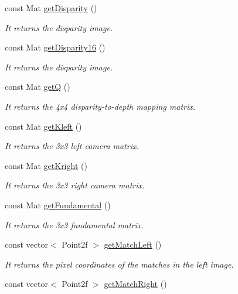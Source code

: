 \begin{DoxyCompactItemize}
const Mat \hyperlink{classStereoCamera_a97607922d84e1a1a006cd7a5aec93a24}{get\+Disparity} ()
\begin{DoxyCompactList}\small\item\em It returns the disparity image. \end{DoxyCompactList}\item 
const Mat \hyperlink{classStereoCamera_a89f9890f50d85be9ebda7a0769279348}{get\+Disparity16} ()
\begin{DoxyCompactList}\small\item\em It returns the disparity image. \end{DoxyCompactList}\item 
const Mat \hyperlink{classStereoCamera_a43bd5710058d9ee0ed94dc8b74e5656c}{get\+Q} ()
\begin{DoxyCompactList}\small\item\em It returns the 4x4 disparity-\/to-\/depth mapping matrix. \end{DoxyCompactList}\item 
const Mat \hyperlink{classStereoCamera_a8533ec543166868e3db471bad0cb61a3}{get\+Kleft} ()
\begin{DoxyCompactList}\small\item\em It returns the 3x3 left camera matrix. \end{DoxyCompactList}\item 
const Mat \hyperlink{classStereoCamera_a62ea986b40a785e589704bb58750e15b}{get\+Kright} ()
\begin{DoxyCompactList}\small\item\em It returns the 3x3 right camera matrix. \end{DoxyCompactList}\item 
const Mat \hyperlink{classStereoCamera_a257d9f531c444b685a0b96ae3908c2d0}{get\+Fundamental} ()
\begin{DoxyCompactList}\small\item\em It returns the 3x3 fundamental matrix. \end{DoxyCompactList}\item 
const vector$<$ Point2f $>$ \hyperlink{classStereoCamera_ac42cf4193f379a3c0ecf5e40c61358f2}{get\+Match\+Left} ()
\begin{DoxyCompactList}\small\item\em It returns the pixel coordinates of the matches in the left image. \end{DoxyCompactList}\item 
const vector$<$ Point2f $>$ \hyperlink{classStereoCamera_ab35a9b702cd5213bd8d4de8491399201}{get\+Match\+Right} ()

\end{DoxyCompactItemize}
